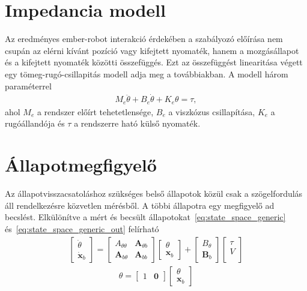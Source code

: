 \section{Impedancia modell}
Az eredményes ember-robot interakció érdekében a szabályozó előírása nem csupán 
az elérni kívánt pozíció vagy kifejtett nyomaték, hanem a mozgásállapot és a kifejtett
nyomaték közötti összefüggés. Ezt az összefüggést linearitása végett egy 
tömeg-rugó-csillapitás modell adja meg a továbbiakban. A modell három paraméterrel
\begin{align}
    M_e \ddot \theta + B_e \dot \theta + K_e \theta = \tau,
\end{align}
ahol $M_e$ a rendszer előírt tehetetlensége, $B_e$ a viszkózus csillapítása, $K_e$ a rugóállandója 
és $\tau$ a rendszerre ható külső nyomaték. 
\section{Állapotmegfigyelő}
Az állapotvisszacsatoláshoz szükséges belső állapotok közül csak a szögelfordulás
áll rendelkezésre közvetlen mérésből. A többi állapotra egy megfigyelő ad becslést.
Elkülönítve a mért és becsült állapotokat~\eqref{eq:state_space_generic} és~\eqref{eq:state_space_generic_out} felírható
\begin{align}
    \begin{bmatrix}
        \dot\theta \\
        \dot{\bm x}_b
    \end{bmatrix}
    =
    \begin{bmatrix}
        A_{\theta\theta} & \bm A_{\theta b} \\
        \bm A_{b \theta} & \bm A_{bb}
    \end{bmatrix}
    \begin{bmatrix}
        \theta \\
        \bm x_b
    \end{bmatrix}
    +
    \begin{bmatrix}
        B_\theta \\
        \bm B_b
    \end{bmatrix}
    \begin{bmatrix}
        \tau \\
        V \\
    \end{bmatrix}
\end{align}
\begin{align}\label{eq:observer_out}
    \theta = 
    \begin{bmatrix}
        1 & \bm 0
    \end{bmatrix}
    \begin{bmatrix}
        \theta \\
        \bm x_b
    \end{bmatrix}
\end{align}
